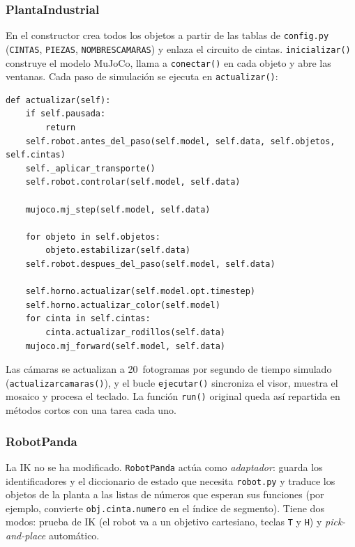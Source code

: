 \documentclass[12pt,a4paper]{article}
\renewcommand{\_}{\guionbajo\allowbreak}
\begin{document}
\subsubsection{PlantaIndustrial}

En el constructor crea todos los objetos a partir de las tablas de \texttt{config.py}
(\texttt{CINTAS}, \texttt{PIEZAS}, \texttt{NOMBRES\_CAMARAS}) y enlaza el circuito de
cintas. \texttt{inicializar()} construye el modelo MuJoCo, llama a \texttt{conectar()} en
cada objeto y abre las ventanas. Cada paso de simulación se ejecuta en
\texttt{actualizar()}:

\begin{lstlisting}[caption={Un paso de simulación en \texttt{PlantaIndustrial.actualizar()}.}]
def actualizar(self):
    if self.pausada:
        return
    self.robot.antes_del_paso(self.model, self.data, self.objetos, self.cintas)
    self._aplicar_transporte()
    self.robot.controlar(self.model, self.data)

    mujoco.mj_step(self.model, self.data)

    for objeto in self.objetos:
        objeto.estabilizar(self.data)
    self.robot.despues_del_paso(self.model, self.data)

    self.horno.actualizar(self.model.opt.timestep)
    self.horno.actualizar_color(self.model)
    for cinta in self.cintas:
        cinta.actualizar_rodillos(self.data)
    mujoco.mj_forward(self.model, self.data)
\end{lstlisting}

Las cámaras se actualizan a 20~fotogramas por segundo de tiempo simulado
(\texttt{actualizar\_camaras()}), y el bucle \texttt{ejecutar()} sincroniza el visor,
muestra el mosaico y procesa el teclado. La función \texttt{run()} original queda así
repartida en métodos cortos con una tarea cada uno.

\subsubsection{RobotPanda}

La IK no se ha modificado. \texttt{RobotPanda} actúa como \emph{adaptador}: guarda los
identificadores y el diccionario de estado que necesita \texttt{robot.py} y traduce los
objetos de la planta a las listas de números que esperan sus funciones (por ejemplo,
convierte \texttt{obj.cinta.numero} en el índice de segmento). Tiene dos modos: prueba de
IK (el robot va a un objetivo cartesiano, teclas \texttt{T} y \texttt{H}) y
\textit{pick-and-place} automático.
\end{document}

